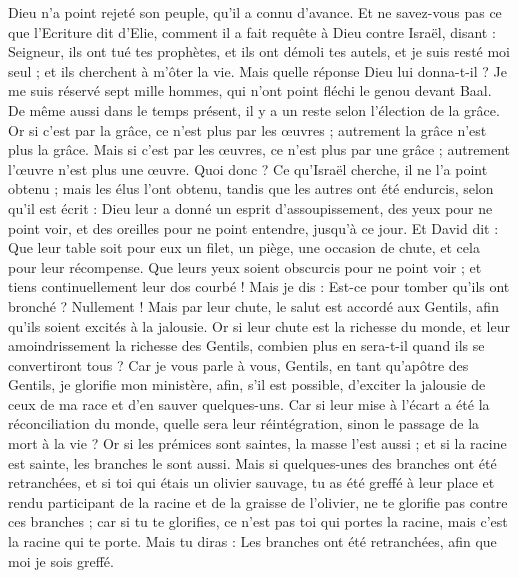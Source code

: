 \begin{multicols}{2}
Dieu n'a point rejeté son peuple, qu’il a connu d’avance. Et ne savez-vous pas ce que l'Ecriture dit d'Elie, comment il a fait requête à Dieu contre Israël, disant :
Seigneur, ils ont tué tes prophètes, et ils ont démoli tes autels, et je suis resté moi seul ; et ils cherchent à m'ôter la vie.
Mais quelle réponse Dieu lui donna-t-il ? Je me suis réservé sept mille hommes, qui n'ont point fléchi le genou devant Baal.
De même aussi dans le temps présent, il y a un reste selon l'élection de la grâce.
Or si c'est par la grâce, ce n'est plus par les œuvres ; autrement la grâce n'est plus la grâce. Mais si c'est par les œuvres, ce n'est plus par une grâce ; autrement l’œuvre n'est plus une œuvre.
Quoi donc ? Ce qu'Israël cherche, il ne l'a point obtenu ; mais les élus l’ont obtenu, tandis que les autres ont été endurcis,
selon qu'il est écrit : Dieu leur a donné un esprit d’assoupissement, des yeux pour ne point voir, et des oreilles pour ne point entendre, jusqu’à ce jour. Et David dit :
Que leur table soit pour eux un filet, un piège, une occasion de chute, et cela pour leur récompense.
Que leurs yeux soient obscurcis pour ne point voir ; et tiens continuellement leur dos courbé !
Mais je dis : Est-ce pour tomber qu’ils ont bronché ? Nullement ! Mais par leur chute, le salut est accordé aux Gentils, afin qu’ils soient excités à la jalousie.
Or si leur chute est la richesse du monde, et leur amoindrissement la richesse des Gentils, combien plus en sera-t-il quand ils se convertiront tous ?
Car je vous parle à vous, Gentils, en tant qu’apôtre des Gentils, je glorifie mon ministère,
afin, s’il est possible, d’exciter la jalousie de ceux de ma race et d’en sauver quelques-uns.
Car si leur mise à l’écart a été la réconciliation du monde, quelle sera leur réintégration, sinon le passage de la mort à la vie ?
Or si les prémices sont saintes, la masse l'est aussi ; et si la racine est sainte, les branches le sont aussi.
Mais si quelques-unes des branches ont été retranchées, et si toi qui étais un olivier sauvage, tu as été greffé à leur place et rendu participant de la racine et de la graisse de l'olivier,
ne te glorifie pas contre ces branches ; car si tu te glorifies, ce n'est pas toi qui portes la racine, mais c'est la racine qui te porte.
Mais tu diras : Les branches ont été retranchées, afin que moi je sois greffé.

\end{multicols}
